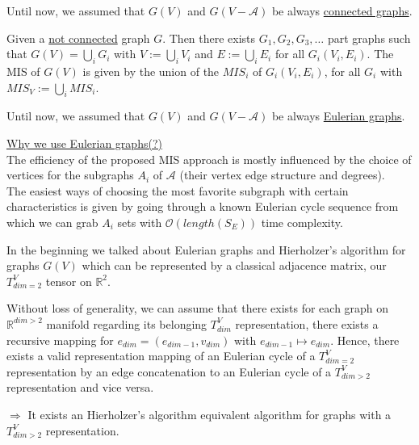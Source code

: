 \documentclass{article}
\newtheorem*{theorem A}{Theorem A}
\newtheorem*{theorem B}{N\"olker's Theorem}
\theoremstyle{remark}
\theoremstyle{remark}
\begin{document}
\vspace{0.3cm}
Until now, we assumed that $G\left(V\right)$ and $G\left(V - \mathcal{A}\right)$ be always \underline{connected graphs}.

\vspace{0.3cm}
Given a \underline{not connected} graph $G$. Then there exists $G_{1}, G_{2}, G_{3}, \dots$ part graphs such that $G\left(V\right) = \bigcup_{i} G_{i}$ with $V := \bigcup_{i} V_{i}$ and $E := \bigcup_{i} E_{i}$ for all $G_{i}\left(V_{i}, E_{i}\right)$. The MIS of $G\left(V\right)$ is given by the union of the $MIS_{i}$ of $G_{i}\left(V_{i}, E_{i}\right)$, for all $G_{i}$ with $MIS_{V} := \bigcup_{i} MIS_{i}$.

\vspace{0.3cm}
Until now, we assumed that $G\left(V\right)$ and $G\left(V - \mathcal{A}\right)$ be always \underline{Eulerian graphs}.

\vspace{0.3cm}
\underline{Why we use Eulerian graphs(?)}\\
The efficiency of the proposed MIS approach is mostly influenced by the choice of vertices for the subgraphs $A_{i}$ of $\mathcal{A}$ (their vertex edge structure and degrees).\\
The easiest ways of choosing the most favorite subgraph with certain characteristics is given by going through a known Eulerian cycle sequence from which we can grab $A_{i}$ sets with $\mathcal{O}\left(length\left(S_{E}\right)\right)$ time complexity.

\vspace{0.3cm}
In the beginning we talked about Eulerian graphs and Hierholzer's algorithm for graphs $G\left(V\right)$ which can be represented by a classical adjacence matrix, our $T^{V}_{dim=2}$ tensor on $\mathbb{R}^{2}$.

\vspace{0.3cm}
Without loss of generality, we can assume that there exists for each graph on $\mathbb{R}^{dim > 2}$ manifold regarding its belonging $T^{V}_{dim}$ representation, there exists a recursive mapping for $e_{dim} = \left(e_{dim-1}, v_{dim}\right)$ with $e_{dim-1} \mapsto e_{dim}$. Hence, there exists a valid representation mapping of an Eulerian cycle of a $T^{V}_{dim=2}$ representation by an edge concatenation to an Eulerian cycle of a $T^{V}_{dim > 2}$ representation and vice versa.

\vspace{0.3cm}
$\Rightarrow$ It exists an Hierholzer's algorithm equivalent algorithm for graphs with a $T^{V}_{dim > 2}$ representation.
\end{document}
